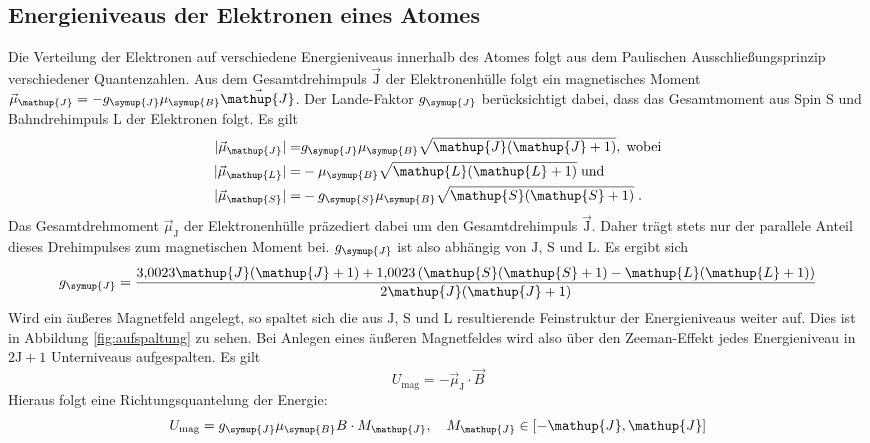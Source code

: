\documentclass[
  bibliography=totoc,     %
  captions=tableheading,  %
  titlepage=firstiscover, %
]{scrartcl}
\begin{document}
\subsection{Energieniveaus der Elektronen eines Atomes}
%
Die Verteilung der Elektronen auf verschiedene Energieniveaus innerhalb des
Atomes folgt aus dem Paulischen Ausschließungsprinzip verschiedener Quantenzahlen. Aus dem
Gesamtdrehimpuls $\vec{\mathup{J}}$ der Elektronenhülle folgt ein magnetisches Moment
$\vec{\mu}_{\mathup{J}}=-g_{\symup{J}}\mu_{\symup{B}}\vec{\mathup{J}}$. Der Lande-Faktor $g_{\symup{J}}$
berücksichtigt dabei, dass das Gesamtmoment aus Spin $\mathup{S}$ und Bahndrehimpuls $\mathup{L}$
der Elektronen folgt. Es gilt
%
\begin{align*}
  |\vec{\mu}_{\mathup{J}}|=&g_{\symup{J}}\mu_{\symup{B}}\sqrt{\mathup{J}(\mathup{J}+1)},\;\text{wobei} \\
  |\vec{\mu}_{\mathup{L}}|=&-\mu_{\symup{B}}\sqrt{\mathup{L}(\mathup{L}+1)}\;\text{und} \\
  |\vec{\mu}_{\mathup{S}}|=&-g_{\symup{S}}\mu_{\symup{B}}\sqrt{\mathup{S}(\mathup{S}+1)}\;.
\end{align*}
%
Das Gesamtdrehmoment $\vec{\mu}_{\mathup{J}}$ der Elektronenhülle präzediert dabei um den
Gesamtdrehimpuls $\vec{\mathup{J}}$. Daher trägt stets nur der parallele Anteil dieses
Drehimpulses zum magnetischen Moment bei. $g_{\symup{J}}$ ist also abhängig von
$\mathup{J}$, $\mathup{S}$ und $\mathup{L}$. Es ergibt sich
%
\begin{equation}
  g_{\symup{J}}=\frac{\num{3.0023}\mathup{J}(\mathup{J}+1)+\num{1.0023}\left(\mathup{S}(\mathup{S}+1)-\mathup{L}(\mathup{L}+1)\right)}{2\mathup{J}(\mathup{J}+1)}
  \label{eq:gj}
\end{equation}
%
Wird ein äußeres Magnetfeld angelegt, so spaltet sich die aus $\mathup{J}$, $\mathup{S}$ und $\mathup{L}$
resultierende Feinstruktur der Energieniveaus weiter auf. Dies ist in Abbildung
\ref{fig:aufspaltung} zu sehen. Bei Anlegen eines äußeren Magnetfeldes wird also über den Zeeman-Effekt jedes
Energieniveau in $2\mathup{J}+1$ Unterniveaus aufgespalten. Es gilt
%
\begin{equation}
  U_{\text{mag}}=-\vec{\mu}_{\mathup{J}}\cdot\vec{B}
\end{equation}
%
Hieraus folgt eine Richtungsquantelung der Energie:
%
\begin{equation}
  U_{\text{mag}}=g_{\symup{J}}\mu_{\symup{B}}B\cdot M_{\mathup{J}},\quad M_{\mathup{J}}\in[-\mathup{J},\mathup{J}]
  \label{penis}
\end{equation}
\end{document}

